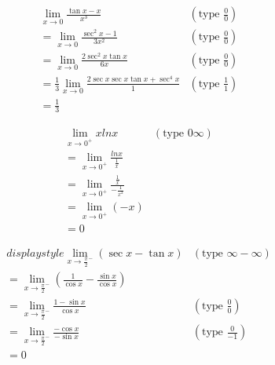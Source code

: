 \begin{eg}
$$\begin{array}{ll}
\displaystyle \lim_{x\to 0} \frac{\tan x -x}{x^3} & (\text{type } \displaystyle \frac{0}{0})\\
\displaystyle = \lim_{x\to 0} \frac{\sec^2 x -1}{3x^2} & (\text{type } \displaystyle \frac{0}{0})\\
\displaystyle = \lim_{x\to 0} \frac{2\sec^2x \tan x}{6x} & (\text{type } \displaystyle \frac{0}{0})\\
\displaystyle = \frac{1}{3} \lim_{x\to 0} \frac{2\sec x \sec x \tan x+ \sec^4 x}{1} & (\text{type } \displaystyle \frac{1}{1})\\
\displaystyle = \frac{1}{3}
\end{array}$$
\end{eg}
\begin{eg}
$$\begin{array}{ll}
\displaystyle \lim_{x\to 0^+} x ln x & (\text{type } 0 \infty)\\
\displaystyle = \lim_{x \to 0^+} \frac{lnx}{\frac{1}{x}}\\
\displaystyle = \lim_{x\to 0^+} \frac{\frac{1}{x}}{-\frac{1}{x^2}}\\
\displaystyle = \lim_{x \to 0^+} (-x)\\
= 0
\end{array}$$
\end{eg}
\begin{eg}
$$\begin{array}{ll}
displaystyle \lim_{x \to \frac{\pi}{2}^-}(\sec x - \tan x) & (\text{type } \infty - \infty)\\
\displaystyle = \lim_{x \to \frac{\pi}{2}^-}(\frac{1}{\cos x} - \frac{\sin x}{\cos x})\\
\displaystyle = \lim_{x \to \frac{\pi}{2}^-} \frac{1-\sin x}{\cos x} & (\text{type } \displaystyle \frac{0}{0})\\
\displaystyle = \lim_{x \to \frac{\pi}{2}^-} \frac{-\cos x}{-\sin x} & (\text{type } \displaystyle \frac{0}{-1})\\
=0
\end{array}$$
\end{eg}
